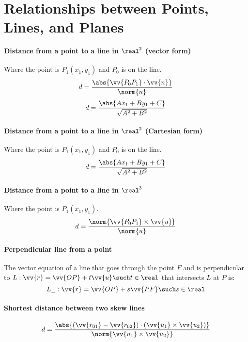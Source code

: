 \section{Relationships between Points, Lines, and Planes}
\paragraph{Distance from a point to a line in $\real^2$ (vector form)}
	Where the point is $P_1 (x_1,y_1)$ and $P_0$ is on the line.
	\begin{equation}
		d = \frac{\abs{\vv{P_0P_1} \cdot \vv{n}}}{\norm{n}}
	\end{equation}
	\begin{equation}
		d = \frac{\abs{Ax_1 + By_1 + C}}{\sqrt{A^2 + B^2}}
	\end{equation}
\paragraph{Distance from a point to a line in $\real^2$ (Cartesian form)}
	Where the point is $P_1 (x_1,y_1)$ and $P_0$ is on the line.
	\begin{equation}
		d = \frac{\abs{Ax_1 + By_1 + C}}{\sqrt{A^2 + B^2}}
	\end{equation}
\paragraph{Distance from a point to a line in $\real^3$}
	Where the point is $P_1 (x_1,y_1)$.
	\begin{equation}
		d = \frac{\norm{\vv{P_0P_1} \times \vv{u}}}{\norm{u}}
	\end{equation}
\paragraph{Perpendicular line from a point}
	The vector equation of a line that goes through the point $F$ and is perpendicular to $L: \vv{r} = \vv{OP} + t\vv{u} \such t \in \real$ that intersects $L$ at $P$ is:
	\begin{equation}
		L_{\perp}: \vv{r} = \vv{OP} + s\vv{PF} \such s \in \real
	\end{equation}
\paragraph{Shortest distance between two skew lines}
	\begin{equation}
		d = \frac{\abs{(\vv{r_{01}} - \vv{r_{02}}) \cdot (\vv{u_1} \times \vv{u_2})}}{\norm{\vv{u_1} \times \vv{u_2}}}
	\end{equation}
